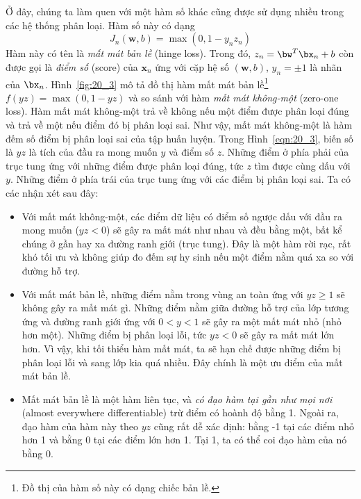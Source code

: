  
Ở đây, chúng ta làm quen với một hàm số khác cũng được sử dụng nhiều trong các hệ thống phân loại. Hàm số này có dạng 
\begin{equation*} 
J_n(\mathbf{w}, b) = \max(0, 1 - y_nz_n) 
\end{equation*} 
Hàm này có tên là \textit{mất mát bản lề} (hinge loss). Trong đó, $z_n = \bw^T\bx_n + b$ còn được gọi là \textit{điểm số} (score) của $\mathbf{x}_n$ ứng với cặp hệ số $(\mathbf{w},
b)$, $y_n = \pm 1$ là nhãn của $\bx_n$. Hình~\ref{fig:20_3} mô tả đồ thị hàm mất mát bản lề\footnote{Đồ thị của hàm số này có dạng chiếc bản lề.} $f(yz) = \max(0, 1 - yz)$ và
so sánh với hàm \textit{mất mát không-một}
({zero-one loss}). Hàm mất mát không-một trả về không nếu một điểm được phân loại đúng và trả về một nếu điểm đó bị phân loại sai. Như vậy, mất mát không-một là hàm {đếm số điểm bị
phân loại sai} của tập huấn luyện. Trong Hình~\ref{eqn:20_3}, biến số là $yz$ là tích của đầu ra
mong muốn $y$ và điểm số $z$. Những điểm ở phía phải của trục
tung ứng với những điểm được phân loại đúng, tức $z$ tìm được cùng dấu với $y$.
Những điểm ở phía trái của trục tung ứng với các điểm bị phân loại sai. Ta có
các nhận xét sau đây: 
\begin{itemize}
    \item Với mất mát không-một, các điểm dữ liệu có điểm số ngược dấu
    với đầu ra mong muốn ($yz < 0$) sẽ gây ra mất mát như nhau và đều bằng một, bất kể
    chúng ở gần hay xa đường ranh giới (trục tung). Đây là một hàm rời rạc, rất
    khó tối ưu và không giúp đo đếm sự hy sinh nếu một điểm nằm quá xa so với đường hỗ trợ.
     
    \item Với mất mát bản lề, những điểm nằm trong vùng an toàn ứng
    với $yz \geq 1$ sẽ không gây ra mất mát gì. Những điểm nằm giữa đường hỗ trợ của
    lớp tương ứng và đường ranh giới ứng với $0 < y < 1$ sẽ gây
    ra một mất mát nhỏ (nhỏ hơn một). Những điểm bị phân loại lỗi, tức $yz
    < 0$ sẽ gây ra mất mát lớn hơn. Vì vậy, khi tối thiểu hàm mất mát, ta sẽ
    hạn chế được những điểm bị phân loại lỗi và sang lớp kia quá nhiều. Đây chính là một ưu điểm của mất mát bản lề.
     
    \item Mất mát bản lề là một hàm liên tục, và \textit{có đạo hàm tại gần
    như mọi nơi} ({almost everywhere differentiable}) trừ điểm có hoành độ bằng 1. Ngoài ra, đạo hàm của hàm này theo $yz$ cũng rất dễ xác định: bằng -1 tại các điểm nhỏ hơn 1 và bằng 0 tại các điểm lớn hơn 1. Tại 1, ta có thể coi đạo hàm của nó bằng 0. 
\end{itemize}
 
